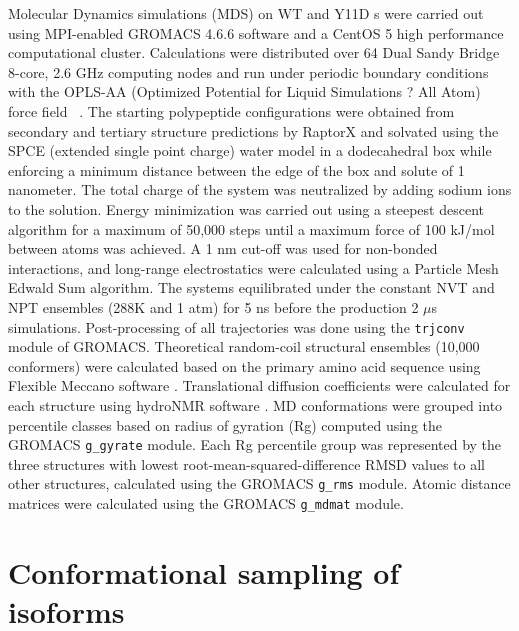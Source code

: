 Molecular Dynamics simulations (MDS) on WT and Y11D \gct s were carried out using MPI-enabled GROMACS 4.6.6 software\cite{hess2008gromacs} and a CentOS 5 high performance computational cluster. Calculations were distributed over 64 Dual Sandy Bridge 8-core, 2.6 GHz computing nodes and run under periodic boundary conditions with the OPLS-AA (Optimized Potential for Liquid Simulations ? All Atom) force field ~\cite{kaminski2001evaluation}.  The starting \gct polypeptide configurations were obtained from secondary and tertiary structure predictions by RaptorX \cite{kallberg2012template} and solvated using the SPCE (extended single point charge) water model in a dodecahedral box while enforcing a minimum distance between the edge of the box and solute of 1 nanometer. The total charge of the system was neutralized by adding sodium ions to the solution. Energy minimization was carried out using a steepest descent algorithm for a maximum of 50,000 steps until a maximum force of 100 kJ/mol between atoms was achieved. A 1 nm cut-off was used for non-bonded interactions, and long-range electrostatics were calculated using a Particle Mesh Edwald Sum algorithm. The systems equilibrated under the constant NVT and NPT ensembles (288K and 1 atm) for 5 ns before the production 2 $\mu$s simulations. Post-processing of all trajectories was done using the \texttt{trjconv} module of GROMACS. Theoretical random-coil structural ensembles (10,000 conformers) were calculated based on the \gct primary amino acid sequence using Flexible Meccano software \cite{ozenne2012flexible}. Translational diffusion coefficients were calculated for each structure using hydroNMR software \cite{de2000hydronmr}. 
MD conformations were grouped into percentile classes based on radius of gyration (Rg) computed using the GROMACS \texttt{g\_gyrate} module. Each Rg percentile group was represented by the three structures with lowest root-mean-squared-difference RMSD values to all other structures, calculated using the GROMACS \texttt{g\_rms} module. Atomic distance matrices were calculated using the GROMACS \texttt{g\_mdmat} module.

\section{Conformational sampling of \gct isoforms}


